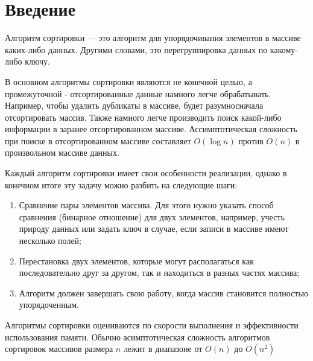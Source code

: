 \chapter*{Введение}

Алгоритм сортировки — это алгоритм для упорядочивания эле­ментов в массиве каких-либо 
данных. Другими словами, это перегруппи­ровка данных по какому-либо ключу. 

В основном алгоритмы сортировки являются не конечной целью, а промежуточной - 
отсортированные данные намного легче обрабаты­вать. Например, чтобы удалить 
дубликаты в массиве, будет разумносначала отсортировать массив. Также намного 
легче производить поиск какой-либо информации в заранее отсортированном массиве. 
Ассимпто­тическая сложность при поиске в отсортированном массиве составляет
$O(\log n)$ против $O(n)$ в произвольном массиве данных.

Каждый алгоритм сортировки имеет свои особенности реализа­ции, однако в конечном итоге
эту задачу можно разбить на следующие шаги:
\begin{enumerate}
	\item Сравнение пары элементов массива. Для этого нужно указать	способ сравнения 
	(бинарное отношение) для двух элементов, например, учесть природу данных или задать 
	ключ в случае, если записи в массиве имеют несколько полей;
	\item Перестановка двух элементов, которые могут располагаться как последовательно 
	друг за другом, так и находиться в разных частях мас­сива;
	\item Алгоритм должен завершать свою работу, когда массив становит­ся полностью 
	упорядоченным.
\end{enumerate}

Алгоритмы сортировки оцениваются по скорости выполнения и эффективности использования памяти.
Обычно асимптотическая сложность алгоритмов сортировок массивов размера $n$ лежит в 
диапазоне от $O(n)$ до $O(n^2)$


